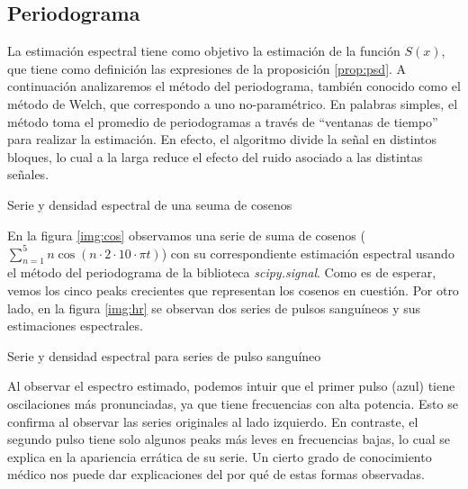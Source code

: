 \documentclass[letterpaper,11pt,oneside]{article}
\theoremstyle{break}
\begin{document}
\subsection{Periodograma}
La estimación espectral tiene como objetivo la estimación de la función $S(x)$, que tiene como definición las expresiones de la proposición \ref{prop:psd}. A continuación analizaremos el método del periodograma, también conocido como el método de Welch, que correspondo a uno no-paramétrico. En palabras simples, el método toma el promedio de periodogramas a través de ``ventanas de tiempo'' para realizar la estimación. En efecto, el algoritmo divide la señal en distintos bloques, lo cual a la larga reduce el efecto del ruido asociado a las distintas señales.
\begin{images}[\label{img:cos}]{Serie y densidad espectral de una seuma de cosenos}
\end{images}
En la figura \ref{img:cos} observamos una serie de suma de cosenos ($\displaystyle \sum^5_{n=1}n\cos(n \cdot 2\cdot 10\cdot \pi t)$) con su correspondiente estimación espectral usando el método del periodograma de la biblioteca \textit{scipy.signal}. Como es de esperar, vemos los cinco peaks crecientes que representan los cosenos en cuestión. Por otro lado, en la figura \ref{img:hr} se observan dos series de pulsos sanguíneos y sus estimaciones espectrales.
\begin{images}[\label{img:hr}]{Serie y densidad espectral para series de pulso sanguíneo}
\end{images}
Al observar el espectro estimado, podemos intuir que el primer pulso (azul) tiene oscilaciones más pronunciadas, ya que tiene frecuencias con alta potencia. Esto se confirma al observar las series originales al lado izquierdo. En contraste, el segundo pulso tiene solo algunos peaks más leves en frecuencias bajas, lo cual se explica en la apariencia errática de su serie. Un cierto grado de conocimiento médico nos puede dar explicaciones del por qué de estas formas observadas.

\end{document}
